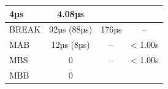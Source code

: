 \begin{longtable}[]{@{}lccc@{}}
\begin{minipage}[t]{0.18\columnwidth}
4µs\strut
\end{minipage} & \begin{minipage}[t]{0.18\columnwidth}\centering\strut
4.08µs\strut
\end{minipage}\tabularnewline
\midrule
\begin{minipage}[t]{0.31\columnwidth}\raggedright\strut
BREAK\strut
\end{minipage} & \begin{minipage}[t]{0.18\columnwidth}\centering\strut
92µs (88µs)\strut
\end{minipage} & \begin{minipage}[t]{0.18\columnwidth}\centering\strut
176µs\strut
\end{minipage} & \begin{minipage}[t]{0.18\columnwidth}\centering\strut
--\strut
\end{minipage}\tabularnewline
\begin{minipage}[t]{0.31\columnwidth}\raggedright\strut
MAB\strut
\end{minipage} & \begin{minipage}[t]{0.18\columnwidth}\centering\strut
12µs (8µs)\strut
\end{minipage} & \begin{minipage}[t]{0.18\columnwidth}\centering\strut
--\strut
\end{minipage} & \begin{minipage}[t]{0.18\columnwidth}\centering\strut
\textless{} 1.00s\strut
\end{minipage}\tabularnewline
\begin{minipage}[t]{0.31\columnwidth}\raggedright\strut
MBS\strut
\end{minipage} & \begin{minipage}[t]{0.18\columnwidth}\centering\strut
0\strut
\end{minipage} & \begin{minipage}[t]{0.18\columnwidth}\centering\strut
--\strut
\end{minipage} & \begin{minipage}[t]{0.18\columnwidth}\centering\strut
\textless{} 1.00s\strut
\end{minipage}\tabularnewline
\begin{minipage}[t]{0.31\columnwidth}\raggedright\strut
MBB\strut
\end{minipage} & \begin{minipage}[t]{0.18\columnwidth}\centering\strut
0\strut
\end{minipage} & \begin{minipage}[t]{0.18\columnwidth}\centering\strut

\end{minipage}
\end{longtable}
